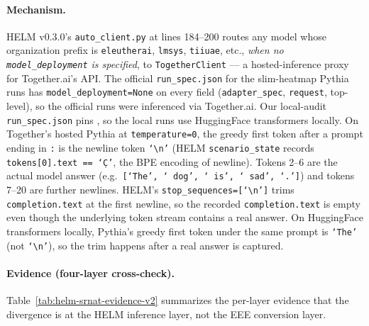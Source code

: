 \paragraph{Mechanism.}
HELM v0.3.0's \texttt{auto\_client.py} at lines 184--200 routes any
  model whose organization prefix is \texttt{eleutherai}, \texttt{lmsys},
  \texttt{tiiuae}, etc., \emph{when no \texttt{model\_deployment} is
  specified}, to \texttt{TogetherClient} — a hosted-inference proxy
  for Together.ai's API.
The official \texttt{run\_spec.json} for the slim-heatmap Pythia runs
  has \texttt{model\_deployment=None} on every field
  (\texttt{adapter\_spec}, \texttt{request}, top-level), so the
  official runs were inferenced via Together.ai.
Our local-audit \texttt{run\_spec.json} pins
  , so the local
  runs use HuggingFace transformers locally.
On Together's hosted Pythia at \texttt{temperature=0}, the greedy first
  token after a prompt ending in \texttt{:} is the newline token
  \texttt{`\textbackslash n'} (HELM \texttt{scenario\_state} records
  \texttt{tokens[0].text == `\d{C}'}, the BPE encoding of newline).
Tokens 2--6 are the actual model answer
  (e.g.\ \texttt{[`The', ` dog', ` is', ` sad', `.']}) and tokens 7--20
  are further newlines.
HELM's \texttt{stop\_sequences=[`\textbackslash n']} trims
  \texttt{completion.text} at the first newline, so the recorded
  \texttt{completion.text} is empty even though the underlying token
  stream contains a real answer.
On HuggingFace transformers locally, Pythia's greedy first token under
  the same prompt is \texttt{`The'} (not \texttt{`\textbackslash n'}),
  so the trim happens after a real answer is captured.

\paragraph{Evidence (four-layer cross-check).}
Table~\ref{tab:helm-srnat-evidence-v2} summarizes the per-layer
  evidence that the divergence is at the HELM inference layer, not the
  EEE conversion layer.


